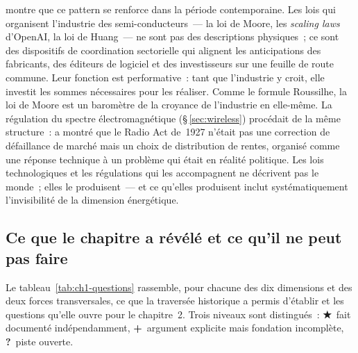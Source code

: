 \textcite{roussilhe_phase_2025} montre que ce pattern se renforce dans la période contemporaine. Les \og lois\fg{} qui organisent l'industrie des semi-conducteurs~--- la loi de Moore, les \emph{scaling laws} d'OpenAI, la \og loi de Huang\fg{}~--- ne sont pas des descriptions physiques~; ce sont des dispositifs de coordination sectorielle qui alignent les anticipations des fabricants, des éditeurs de logiciel et des investisseurs sur une feuille de route commune. Leur fonction est performative~: tant que l'industrie y croit, elle investit les sommes nécessaires pour les réaliser. Comme le formule Roussilhe, la loi de Moore est un \og baromètre de la croyance de l'industrie en elle-même\fg{}. La régulation du spectre électromagnétique (§\,\ref{sec:wireless}) procédait de la même structure~: \textcite{hazlett_rationality_1990} a montré que le Radio Act de~1927 n'était pas une correction de défaillance de marché mais un choix de distribution de rentes, organisé comme une réponse technique à un problème qui était en réalité politique. Les \og lois\fg{} technologiques et les régulations qui les accompagnent ne décrivent pas le monde~; elles le produisent~--- et ce qu'elles produisent inclut systématiquement l'invisibilité de la dimension énergétique.


\subsection{Ce que le chapitre a révélé et ce qu'il ne peut pas faire}\label{subsec:limites}

Le tableau~\ref{tab:ch1-questions} rassemble, pour chacune des dix dimensions et des deux forces transversales, ce que la traversée historique a permis d'établir et les questions qu'elle ouvre pour le chapitre~2. Trois niveaux sont distingués~: \textbf{★}~fait documenté indépendamment, \textbf{+}~argument explicite mais fondation incomplète, \textbf{?}~piste ouverte.

